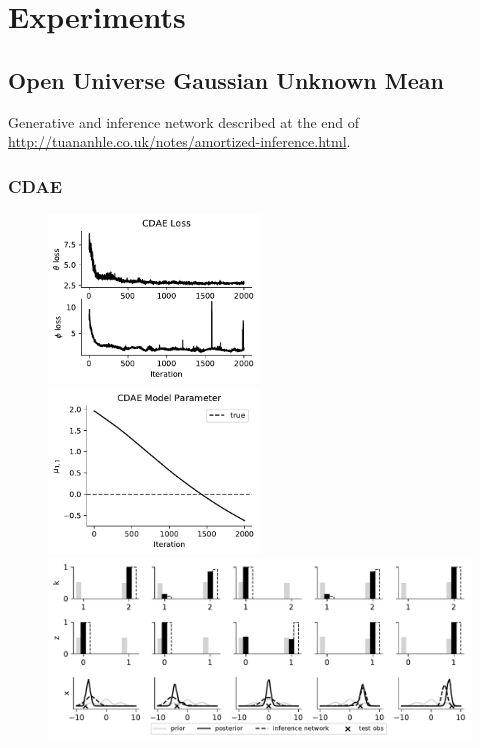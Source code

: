 
\section{Experiments}

\subsection{Open Universe Gaussian Unknown Mean}

Generative and inference network described at the end of \url{http://tuananhle.co.uk/notes/amortized-inference.html}.

\subsubsection{CDAE}

\begin{figure}[!htb]
    \centering
    \includegraphics[width=0.5\textwidth]{figures/gmm-open-universe/cdae_loss}
    \includegraphics[width=0.5\textwidth]{figures/gmm-open-universe/cdae_model_param}
    \includegraphics[width=\textwidth]{figures/gmm-open-universe/cdae_inference}
\end{figure}

